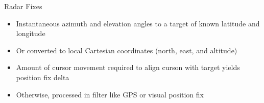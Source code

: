\begin{frame}
Radar Fixes
 \begin{itemize}
 \item Instantaneous azimuth and elevation angles to a target of known latitude and longitude
 \item Or converted to local Cartesian coordinates (north, east, and altitude)
 \item Amount of cursor movement required to align curson with target yields position fix delta
 \item Otherwise, processed in filter like GPS or visual position fix
\end{itemize}
\end{frame}
